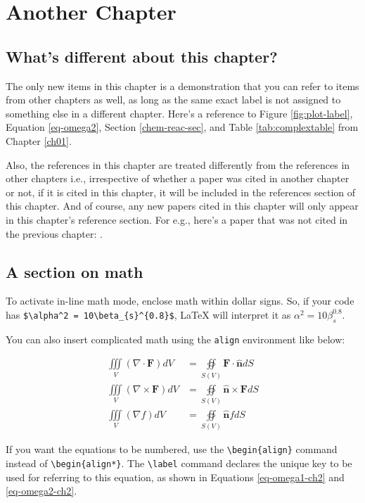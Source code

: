 \chapter{Another Chapter}\label{ch02}
\section{What's different about this chapter?}
The only new items in this chapter is a demonstration that you can refer to items from other chapters as well, as long as the same exact label is not assigned to something else in a different chapter. Here's a reference to Figure \ref{fig:plot-label}, Equation \ref{eq-omega2}, Section \ref{chem-reac-sec}, and Table \ref{tab:complextable} from Chapter \ref{ch01}.

Also, the references in this chapter are treated differently from the references in other chapters i.e., irrespective of whether a paper was cited in another chapter or not, if it is cited in this chapter, it will be included in the references section of this chapter. And of course, any new papers cited in this chapter will only appear in this chapter's reference section. For e.g., here's a paper that was not cited in the previous chapter: \citep{Robinson2018}.

\section{A section on math}\label{math-sec-ch2}
To activate in-line math mode, enclose math within dollar signs. So, if your code has \verb|$\alpha^2 = 10\beta_{s}^{0.8}$|, \LaTeX{} will interpret it as $\alpha^2 = 10\beta_{s}^{0.8}$.

You can also insert complicated math using the \verb|align| environment like below:

\begin{align*}
  \iiint\limits_V(\nabla \cdot \mathbf{F}) dV
      & = \oiint \limits_{S(V)} \mathbf{F \cdot \hat{n}} dS \\
  \iiint\limits_V(\nabla \times \mathbf{F}) dV
      & = \oiint \limits_{S(V)} \mathbf{\hat{n} \times F} dS \\
  \iiint\limits_V(\nabla f) dV
      & = \oiint\limits_{S(V)}\mathbf{\hat{n}}f dS
\end{align*}

If you want the equations to be numbered, use the \verb|\begin{align}| command instead of \verb|\begin{align*}|. The \verb|\label| command declares the unique key to be used for referring to this equation, as shown in Equations \ref{eq-omega1-ch2} and \ref{eq-omega2-ch2}.

